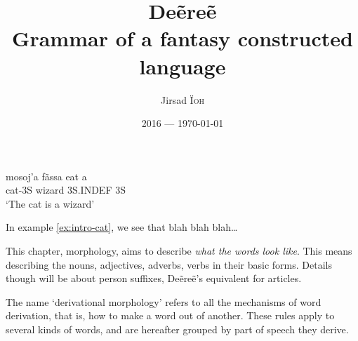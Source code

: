 \documentclass[a4paper, oneside]{book}
\title{Deẽreẽ\\Grammar of a fantasy constructed language}
\author{Jirsad \textsc{Ïoh}}
\date{2016 — \today}
\begin{document}
\frontmatter
\maketitle
\tableofcontents
{}
\begin{exe}
\ex\label{ex:intro-cat}
\gll mosoj’a fãssa eat a\\
cat-3S wizard 3S.INDEF 3S\\
\trans ‘The cat is a wizard’
\end{exe}

In example \ref{ex:intro-cat}, we see that blah blah blah…

\mainmatter
\label{chap:phonology}


\label{chap:morphology}
This chapter, morphology, aims to describe \emph{what the words look like}. This means describing
the nouns, adjectives, adverbs, verbs in their basic forms. Details though will be about person
suffixes, Deẽreẽ’s equivalent for articles.








\label{chap:derivational-morphology}
The name ‘derivational morphology’ refers to all the mechanisms of word derivation, that is, how to
make a word out of another. These rules apply to several kinds of words, and are hereafter grouped
by part of speech they derive.



\label{chap:conjugation}
\end{document}
